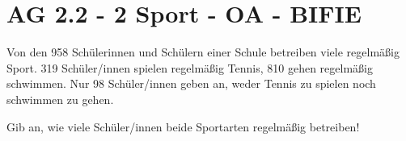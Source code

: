 \section{AG 2.2 - 2 Sport  - OA - BIFIE}

\begin{beispiel}[AG 2.2]{1} %
Von den 958 Schülerinnen und Schülern einer Schule betreiben viele regelmäßig Sport.
319 Schüler/innen spielen regelmäßig Tennis, 810 gehen regelmäßig schwimmen. Nur 98 Schüler/innen geben an, weder Tennis zu spielen noch schwimmen zu gehen.

\leer

Gib an, wie viele Schüler/innen beide Sportarten regelmäßig betreiben!	

\end{beispiel}